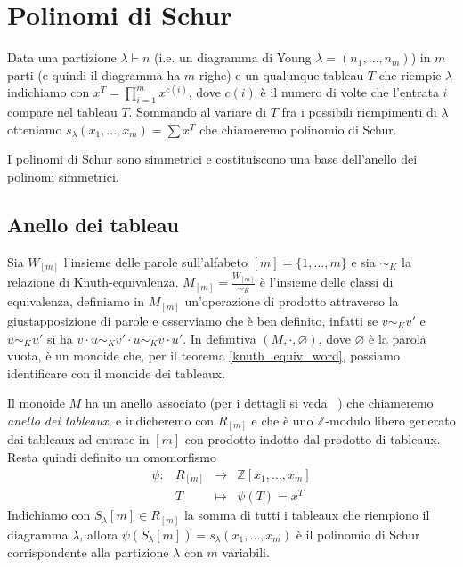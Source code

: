 \chapter{Polinomi di Schur}

\begin{defn}
Data una partizione $\lambda \vdash n$ (i.e. un diagramma di Young
$\lambda = (n_1, \ldots, n_m)$) in $m$ parti (e quindi il diagramma ha
$m$ righe) e un qualunque tableau $T$ che riempie $\lambda$ indichiamo
con $x^T = \prod\limits_{i = 1}^m x^{c(i)}$, dove $c(i)$ \`e il numero
di volte che l'entrata $i$ compare nel tableau $T$. Sommando al variare di
$T$ fra i possibili riempimenti di $\lambda$ otteniamo
\begin{math}
s_\lambda(x_1,\ldots,x_m) = \sum x^T
\end{math}
che chiameremo polinomio di Schur.
\end{defn}
I polinomi di Schur sono simmetrici e costituiscono una base
dell'anello dei polinomi simmetrici.
\section{Anello dei tableau}

Sia $W_{[m]}$ l'insieme delle parole sull'alfabeto $[m]=\{1,\ldots,m\}$ e sia
$\sim_K$ la relazione di Knuth-equivalenza. $M_{[m]} =
\frac{W_{[m]}}{\sim_K}$ \`e l'insieme delle classi di equivalenza,
definiamo in $M_{[m]}$ un'operazione di prodotto attraverso la giustapposizione di parole e
osserviamo che \`e ben definito, infatti se $v \sim_K v'$ e $u \sim_K
u'$ si ha $v \cdot u \sim_K v' \cdot u \sim_K v \cdot u'$. In
definitiva $(M, \cdot, \varnothing)$, dove $\varnothing$ \`e la
parola vuota, \`e un monoide che, per il
teorema \ref{knuth_equiv_word}, possiamo identificare con il monoide
dei tableaux.

Il monoide $M$ ha un anello associato (per i dettagli si veda ~\cite{lang2002algebra}) che chiameremo \emph{anello dei tableaux}, e indicheremo con
$R_{[m]}$ e che \`e uno $\mathbb{Z}$-modulo libero generato dai
tableaux ad entrate in $[m]$ con prodotto indotto dal prodotto di tableaux.
Resta quindi definito un omomorfismo
\begin{equation}
\begin{matrix}\label{ring_tab}
\psi: & R_{[m]} & \rightarrow  & \mathbb{Z}[x_1,\ldots,x_m]\\
& T      & \mapsto & \psi(T)=x^T
\end{matrix}
\end{equation}
Indichiamo con $S_\lambda[m] \in R_{[m]}$ la somma di tutti i tableaux
che riempiono il diagramma $\lambda$, allora
$\psi(S_\lambda[m])=s_\lambda(x_1,\ldots,x_m)$ \`e il polinomio di
Schur corrispondente alla partizione $\lambda$ con $m$ variabili.

